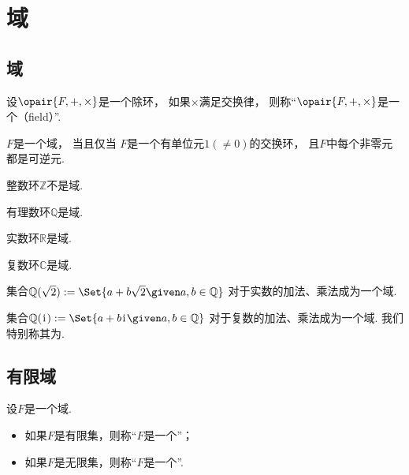 \section{域}
\subsection{域}
\begin{definition}
设\(\opair{F,+,\times}\)是一个除环，
如果\(\times\)满足交换律，
则称“\(\opair{F,+,\times}\)是一个（field）”.
\end{definition}

\begin{theorem}
\(F\)是一个域，
当且仅当
\(F\)是一个有单位元\(1(\neq0)\)的交换环，
且\(F\)中每个非零元都是可逆元.
\end{theorem}

\begin{example}
整数环\(\mathbb{Z}\)不是域.
\end{example}

\begin{example}
有理数环\(\mathbb{Q}\)是域.
\end{example}

\begin{example}
实数环\(\mathbb{R}\)是域.
\end{example}

\begin{example}
复数环\(\mathbb{C}\)是域.
\end{example}

\begin{example}
集合\(
	\mathbb{Q}(\sqrt{2})
	\defeq
	\Set{ a + b \sqrt{2} \given a,b \in \mathbb{Q} }
\)
对于实数的加法、乘法成为一个域.
\end{example}

\begin{example}
集合\(
	\mathbb{Q}(\iu)
	\defeq
	\Set{ a + b \iu \given a,b \in \mathbb{Q} }
\)
对于复数的加法、乘法成为一个域.
我们特别称其为.
\end{example}

\subsection{有限域}
\begin{definition}
设\(F\)是一个域.
\begin{itemize}
	\item 如果\(F\)是有限集，则称“\(F\)是一个”；
	\item 如果\(F\)是无限集，则称“\(F\)是一个”.
\end{itemize}
\end{definition}

